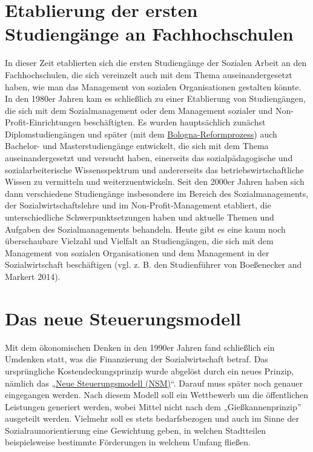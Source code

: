 \documentclass[
  letterpaper,
]{book}
\begin{document}
\section{Etablierung der ersten Studiengänge an
Fachhochschulen}\label{fachhochschulen}

In dieser Zeit etablierten sich die ersten Studiengänge der Sozialen
Arbeit an den Fachhochschulen, die sich vereinzelt auch mit dem Thema
auseinandergesetzt haben, wie man das Management von sozialen
Organisationen gestalten könnte. In den 1980er Jahren kam es schließlich
zu einer Etablierung von Studiengängen, die sich mit dem
Sozialmanagement oder dem Management sozialer und
Non-Profit-Einrichtungen beschäftigten. Es wurden hauptsächlich zunächst
Diplomstudiengängen und später (mit dem
\href{https://de.wikipedia.org/wiki/Bologna-Prozess}{Bologna-Reformprozess})
auch Bachelor- und Masterstudiengänge entwickelt, die sich mit dem Thema
auseinandergesetzt und versucht haben, einerseits das sozialpädagogische
und sozialarbeiterische Wissensspektrum und andererseits das
betriebswirtschaftliche Wissen zu vermitteln und weiterzuentwickeln.
Seit den 2000er Jahren haben sich dann verschiedene Studiengänge
insbesondere im Bereich des Sozialmanagements, der
Sozialwirtschaftslehre und im Non-Proﬁt-Management etabliert, die
unterschiedliche Schwerpunktsetzungen haben und aktuelle Themen und
Aufgaben des Sozialmanagements behandeln. Heute gibt es eine kaum noch
überschaubare Vielzahl und Vielfalt an Studiengängen, die sich mit dem
Management von sozialen Organisationen und dem Management in der
Sozialwirtschaft beschäftigen (vgl. z. B. den Studienführer von
Boeßenecker and Markert 2014).

\section{Das neue Steuerungsmodell}\label{steuerungsmodell}

Mit dem ökonomischen Denken in den 1990er Jahren fand schließlich ein
Umdenken statt, was die Finanzierung der Sozialwirtschaft betraf. Das
ursprüngliche Kostendeckungsprinzip wurde abgelöst durch ein neues
Prinzip, nämlich das
„\href{https://de.wikipedia.org/wiki/Neues_Steuerungsmodell}{Neue
Steuerungsmodell (NSM)}``. Darauf muss später noch genauer eingegangen
werden. Nach diesem Modell soll ein Wettbewerb um die öffentlichen
Leistungen generiert werden, wobei Mittel nicht nach dem
„Gießkannenprinzip'' ausgeteilt werden. Vielmehr soll es stets
bedarfsbezogen und auch im Sinne der Sozialraumorientierung eine
Gewichtung geben, in welchen Stadtteilen beispielsweise bestimmte
Förderungen in welchem Umfang fließen.
\end{document}
